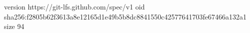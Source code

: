version https://git-lfs.github.com/spec/v1
oid sha256:f2805b62f3613a8e12165d1e49b5b8dc8841550c42577641703fe67466a132a1
size 94
